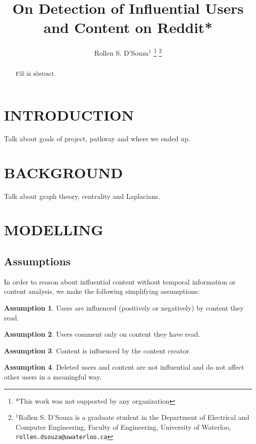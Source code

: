 \documentclass[letterpaper, 10 pt, conference]{ieeeconf}
\title{\LARGE \bf
On Detection of Influential Users and Content on Reddit*
}
\author{Rollen S. D'Souza$^{1}$%
  \thanks{*This work was not supported by any organization}%
  \thanks{$^{1}$Rollen S. D'Souza is a graduate student in the
    Department of Electrical and Computer Engineering,
    Faculty of Engineering,
    University of Waterloo,
    \texttt{rollen.dsouza@uwaterloo.ca}
  }%
}
\theoremstyle{definition}
\newtheorem{assumption}{Assumption}[section]
\newcommand{\red}{\color{red}}
\begin{document}
\maketitle
\thispagestyle{empty}
\pagestyle{empty}


\begin{abstract}
{\red Fill in abstract.}

\end{abstract}


\section{INTRODUCTION}
{\red Talk about goals of project, pathway and where we ended up.}

\section{BACKGROUND}
{\red Talk about graph theory, centrality and Laplacians.}

\section{MODELLING}

\subsection{Assumptions}
In order to reason about influential content without temporal information or content analysis, we make the following simplifying assumptions:

\begin{assumption}
  Users are influenced (positively or negatively) by content they read.
  \label{assume:1}
\end{assumption} 

\begin{assumption}
  Users comment only on content they have read.
  \label{assume:2}
\end{assumption}

\begin{assumption}
  Content is influenced by the content creator.
  \label{assume:3}
\end{assumption}

\begin{assumption}
  Deleted users and content are not influential and do not affect other users in a meaningful way.
  \label{assume:4}
\end{assumption}
\end{document}
